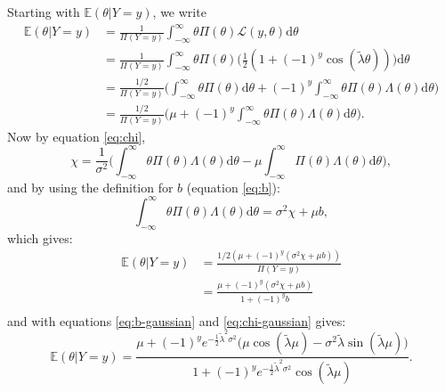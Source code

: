 \documentclass[]{report}
\begin{document}
Starting with $\mathbb{E}(\theta | Y=y)$, we write
\begin{align}
    \mathbb{E}(\theta | Y=y) &= \frac{1}{\Pi(Y=y)} \int_{-\infty}^{\infty} \theta \Pi(\theta)\mathcal{L}(y, \theta)\text{d}\theta\\
    &= \frac{1}{\Pi(Y=y)} \int_{-\infty}^{\infty} \theta \Pi(\theta)\Big(\frac{1}{2}(1 + (-1)^{y} \cos(\tilde{\lambda} \theta))\Big)\text{d}\theta\\
    &= \frac{1/2}{\Pi(Y=y)} \Bigg(\int_{-\infty}^{\infty}\theta\Pi(\theta)\text{d}\theta + (-1)^y \int_{-\infty}^{\infty}\theta\Pi(\theta)\Lambda(\theta)\text{d}\theta\Bigg)\\
    &= \frac{1/2}{\Pi(Y=y)} \Bigg(\mu + (-1)^y \int_{-\infty}^{\infty}\theta\Pi(\theta)\Lambda(\theta)\text{d}\theta\Bigg).
\end{align}
Now by equation \eqref{eq:chi},
\begin{equation}
    \chi = \frac{1}{\sigma^2}\Bigg( \int_{-\infty}^{\infty} \theta\Pi(\theta)\Lambda(\theta)\text{d}\theta - \mu \int_{-\infty}^{\infty} \Pi(\theta)\Lambda(\theta)\text{d}\theta\Bigg),
\end{equation}
and by using the definition for $b$ (equation \eqref{eq:b}):
\begin{equation}
    \int_{-\infty}^{\infty} \theta\Pi(\theta)\Lambda(\theta)\text{d}\theta = \sigma^2\chi + \mu b,
\end{equation}
which gives:
\begin{align}
    \mathbb{E}(\theta | Y=y) &= \frac{1/2(\mu + (-1)^y(\sigma^2\chi + \mu b))}{\Pi(Y=y)}\\
    &= \frac{\mu + (-1)^y(\sigma^2\chi + \mu b)}{1+(-1)^yb}\\
\end{align}
and with equations \eqref{eq:b-gaussian} and \eqref{eq:chi-gaussian} gives:
\begin{equation}
    \mathbb{E}(\theta | Y=y) = \frac{\mu + (-1)^ye^{-\frac{1}{2}\tilde{\lambda}^2\sigma^2}\big(\mu\cos(\tilde{\lambda}\mu) - \sigma^2\tilde{\lambda} \sin(\tilde{\lambda}\mu)\big)}{1+(-1)^ye^{-\frac{1}{2}\tilde{\lambda}^2\sigma^2}\cos(\tilde{\lambda}\mu)}.
\end{equation}
\end{document}
